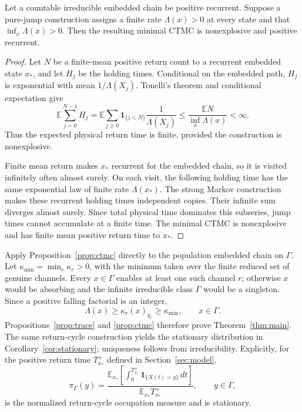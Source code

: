 \begin{proposition}\label{prop:ctmc}
Let a countable irreducible embedded chain be positive recurrent.  Suppose a
pure-jump construction assigns a finite rate \(\Lambda(x)>0\) at every state
and that \(\inf_x\Lambda(x)>0\).  Then the resulting minimal CTMC is
nonexplosive and positive recurrent.
\end{proposition}

\begin{proof}
Let \(N\) be a finite-mean positive return count to a recurrent embedded state
\(x_*\), and let \(H_j\) be the holding times.  Conditional on the embedded
path, \(H_j\) is exponential with mean \(1/\Lambda(X_j)\).  Tonelli's theorem
and conditional expectation give
\[
 \mathbb E\sum_{j=0}^{N-1}H_j
 =\mathbb E\sum_{j\ge0}\mathbf1_{\{j<N\}}
   \frac1{\Lambda(X_j)}
 \le\frac{\mathbb EN}{\inf_x\Lambda(x)}<\infty.
\]
Thus the expected physical return time is finite, provided the construction
is nonexplosive.

Finite mean return makes \(x_*\) recurrent for the embedded chain, so it is
visited infinitely often almost surely.  On each visit, the following
holding time has the same exponential law of finite rate \(\Lambda(x_*)\).
The strong Markov construction makes these recurrent holding times
independent copies.  Their infinite sum diverges almost surely.  Since total
physical time dominates this subseries, jump times cannot accumulate at a
finite time.  The minimal CTMC is nonexplosive and has finite mean positive
return time to \(x_*\).
\end{proof}

Apply Proposition~\ref{prop:ctmc} directly to the population embedded chain on
\(\Gamma\).  Let \(\kappa_{\min}=\min_r\kappa_r>0\), with the minimum taken
over the finite reduced set of genuine channels.  Every \(x\in\Gamma\) enables
at least one such channel \(r\); otherwise \(x\) would be absorbing and the
infinite irreducible class \(\Gamma\) would be a singleton.  Since a positive
falling factorial is an integer,
\begin{equation}\label{eq:rate-lower}
  \Lambda(x)\ge\kappa_r(x)_{y_r}\ge\kappa_{\min},
  \qquad x\in\Gamma.
\end{equation}
Propositions~\ref{prop:trace} and \ref{prop:ctmc} therefore prove
Theorem~\ref{thm:main}.  The same return-cycle construction yields the
stationary distribution in Corollary~\ref{cor:stationary}; uniqueness follows
from irreducibility.  Explicitly, for the positive return time \(T_{x_*}^+\)
defined in Section~\ref{sec:model},
\begin{equation}\label{eq:occupation-formula}
 \pi_\Gamma(y)=
 \frac{\displaystyle
   \mathbb E_{x_*}\!\left[\int_0^{T_{x_*}^+}
      \mathbf1_{\{X(t)=y\}}\,dt\right]}
 {\mathbb E_{x_*}T_{x_*}^+},
 \qquad y\in\Gamma,
\end{equation}
is the normalized return-cycle occupation measure and is stationary.

